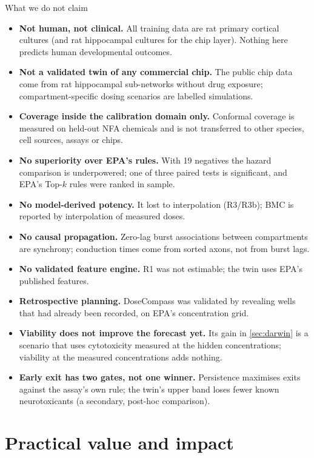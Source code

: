 \documentclass[11pt,a4paper]{article}
\newcommand{\DC}{DoseCompass}
\newcommand{\nNeg}{19}
\begin{document}
\begin{claimbox}{What we do not claim}\label{sec:boundaries}
\begin{itemize}[leftmargin=1.2em]
\item \textbf{Not human, not clinical.} All training data are rat primary cortical cultures (and rat hippocampal
cultures for the chip layer). Nothing here predicts human developmental outcomes.
\item \textbf{Not a validated twin of any commercial chip.} The public chip data come from rat hippocampal
sub-networks without drug exposure; compartment-specific dosing scenarios are labelled simulations.
\item \textbf{Coverage inside the calibration domain only.} Conformal coverage is measured on held-out NFA
chemicals and is not transferred to other species, cell sources, assays or chips.
\item \textbf{No superiority over EPA's rules.} With \nNeg{} negatives the hazard comparison is underpowered; one of
three paired tests is significant, and EPA's Top-\(k\) rules were ranked in sample.
\item \textbf{No model-derived potency.} It lost to interpolation (R3/R3b); BMC is reported by interpolation of
measured doses.
\item \textbf{No causal propagation.} Zero-lag burst associations between compartments are synchrony; conduction
times come from sorted axons, not from burst lags.
\item \textbf{No validated feature engine.} R1 was not estimable; the twin uses EPA's published features.
\item \textbf{Retrospective planning.} \DC{} was validated by revealing wells that had already been recorded, on
EPA's concentration grid.
\item \textbf{Viability does not improve the forecast yet.} Its gain in \cref{sec:darwin} is a scenario that uses
cytotoxicity measured at the hidden concentrations; viability at the measured concentrations adds nothing.
\item \textbf{Early exit has two gates, not one winner.} Persistence maximises exits against the assay's own
rule; the twin's upper band loses fewer known neurotoxicants (a secondary, post-hoc comparison).
\end{itemize}
\end{claimbox}

\section{Practical value and impact}\label{sec:value}
\end{document}
